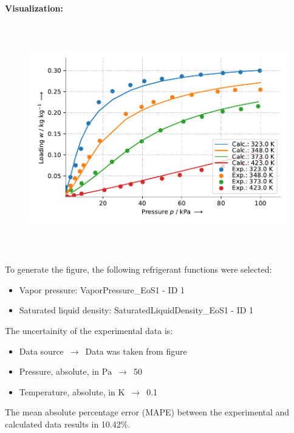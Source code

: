 \textbf{Visualization:}
%
\begin{figure}[!htp]
{\noindent\includegraphics[height=10cm, keepaspectratio]{figs/ads/ads_Propane_mof_powder_cubtc_DualSiteSips_1.pdf}}
\end{figure}
%

To generate the figure, the following refrigerant functions were selected:
\begin{itemize}
\item Vapor pressure: VaporPressure\_EoS1 - ID 1
\item Saturated liquid density: SaturatedLiquidDensity\_EoS1 - ID 1
\end{itemize}

The uncertainity of the experimental data is:
\begin{itemize}
\item Data source $\,\to\,$ Data was taken from figure
\item Pressure, absolute, in $\si{\pascal}$ $\,\to\,$ 50
\item Temperature, absolute, in $\si{\kelvin}$ $\,\to\,$ 0.1
\end{itemize}

The mean absolute percentage error (MAPE) between the experimental and calculated data results in 10.42\%.
\FloatBarrier
\newpage
